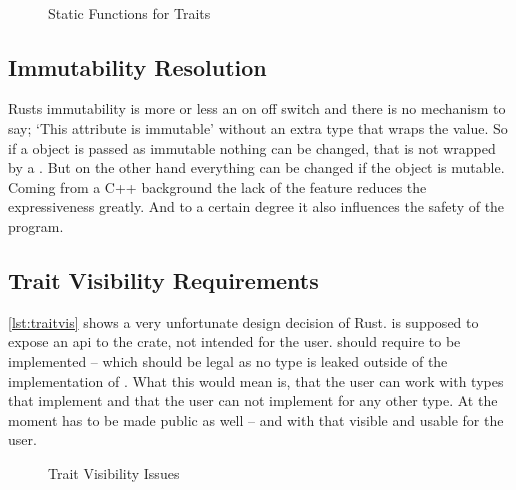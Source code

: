 \documentclass[thesis]{subfiles}
\begin{document}
    \newsavebox{\staticThree}
    \begin{lrbox}{\staticThree}
      
    \end{lrbox}

    \begin{figure}[ht]
      \captionsetup{type=lstlisting}
      \usebox{\staticOne}\hfill%
      \usebox{\staticTwo}\\%
      \usebox{\staticThree}
      \caption{Static Functions for Traits}\label{lst:static}
    \end{figure}

  \subsection{Immutability Resolution}
    Rusts immutability is more or less an on off switch and there is no mechanism to say; `This attribute is immutable' without an extra type that wraps the value.
    So if a object is passed as immutable nothing can be changed, that is not wrapped by a \UnsafeCellT.
    But on the other hand everything can be changed if the object is mutable.
    Coming from a C++ background the lack of the  feature reduces the expressiveness greatly.
    And to a certain degree it also influences the safety of the program.

    \subsection{Trait Visibility Requirements}\label{sec:traitVisibility}
    \autoref{lst:traitvis} shows a very unfortunate design decision of Rust.
     is supposed to expose an \gls{api} to the crate, not intended for the user.
     should require \A to be implemented -- which should be legal as no type is leaked outside of the implementation of \B.
    What this would mean is, that the user can work with types that implement \B and that the user can not implement \B for any other type.
    At the moment  has to be made public as well -- and with that visible and usable for the user.

    \begin{figure}[ht]
      \captionsetup{type=lstlisting}
      
      \caption{Trait Visibility Issues}\label{lst:traitvis}
    \end{figure}
\end{document}
